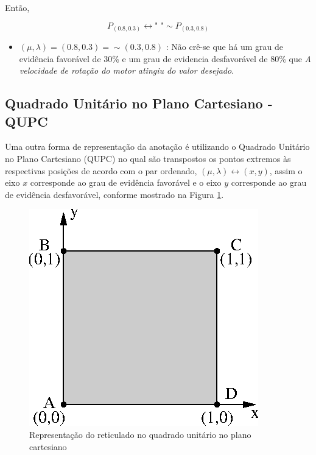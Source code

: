Então,
\begin{center}
\begin{equation}
P_{(0.8,0.3)} \leftrightarrow \textrm{"   "} \sim P_{(0.3,0.8)}
\end{equation}
\end{center}

\begin{itemize}
\item 
$(\mu, \lambda ) = (0.8,0.3) = \sim (0.3,0.8)$ : Não crê-se que há um grau de evidência favorável de 30\% e um grau de evidencia desfavorável de 80\% que \emph{A velocidade de rotação do motor atingiu do valor desejado}.
\end{itemize}



\subsection{Quadrado Unitário no Plano Cartesiano - QUPC}

Uma outra forma de representação da anotação é utilizando o Quadrado Unitário no Plano Cartesiano (QUPC) no qual são transpostos os pontos extremos às respectivas posições de acordo com o par ordenado,  $(\mu, \lambda ) \leftrightarrow (x,y) $, assim o eixo $x$ corresponde ao grau de evidência favorável e o eixo $y$ corresponde ao grau de evidência desfavorável, conforme mostrado na Figura \ref{fig:reticuladoQUPC}.



\begin{figure}[!htb]
\center\includegraphics[scale=1.0]{./pic/C422qupc.eps}
\caption{Representação do reticulado no quadrado unitário no plano cartesiano}
\label{fig:reticuladoQUPC}
\end{figure}

